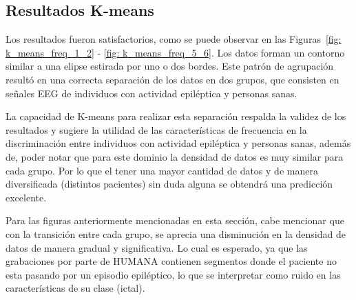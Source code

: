 \subsection{Resultados K-means}
Los resultados fueron satisfactorios, como se puede observar en las Figuras~\ref{fig: k_means_freq_1_2} -  \ref{fig: k_means_freq_5_6}. Los datos forman un contorno similar a una elipse estirada por uno o dos bordes. Este patrón de agrupación resultó en una correcta separación de los datos en dos grupos, que consisten en señales EEG de individuos con actividad epiléptica y personas sanas. 

La capacidad de K-means para realizar esta separación respalda la validez de los resultados y sugiere la utilidad de las características de frecuencia en la discriminación entre individuos con actividad epiléptica y personas sanas, además de, poder notar que para este dominio la densidad de datos es muy similar para cada grupo. Por lo que el tener una mayor cantidad de datos y de manera diversificada (distintos pacientes) sin duda alguna se obtendrá una predicción excelente. 

Para las figuras anteriormente mencionadas en esta sección, cabe mencionar que con la transición entre cada grupo, se aprecia una disminución en la densidad de datos de manera gradual y significativa. Lo cual es esperado, ya que las grabaciones por parte de HUMANA contienen segmentos donde el paciente no esta pasando por un episodio epiléptico, lo que se interpretar como ruido en las características de su clase (ictal).

